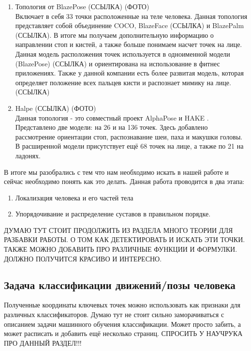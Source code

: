 \begin{enumerate} 
  \item Топология от BlazePose (ССЫЛКА) (ФОТО)\\
  \label{BlazePose's Topology}
  Включает в себя 33 точки расположенные на теле человека. Данная топология представляет собой объединение COCO, BlazeFace (ССЫЛКА) и BlazePalm (ССЫЛКА). В итоге мы получаем дополнительную информацию о направлении стоп и кистей, а также больше понимаем насчет точек на лице. Данная модель расположения точек используется в одноименной модели (BlazePose) (ССЫЛКА) и ориентирована на использование в фитнес приложениях. Также у данной компании есть более развитая модель, которая определяет положение всех пальцев кисти и распознает мимику на лице. (ССЫЛКА)
  \item Halpe (ССЫЛКА) (ФОТО)\\
  \label{Halpe}
  Данная топология - это совместный проект AlphaPose \cite{fang2017rmpe} и HAKE \cite{li2020pastanet}. Представлено две модели: на 26 и на 136 точек. Здесь добавлено рассмотрение ориентации стоп, распознавание шеи, паха и макушки головы. В расширенной модели присутствует ещё 68 точек на лице, а также по 21 на ладонях.
\end{enumerate}

В итоге мы разобрались с тем что нам необходимо искать в нашей работе и сейчас необходимо понять как это делать. Данная работа проводится в два этапа: 
\begin{enumerate}
	\item Локализация человека и его частей тела
	\item Упорядочивание и распределение суставов в правильном порядке.
\end{enumerate}

ДУМАЮ ТУТ СТОИТ ПРОДОЛЖИТЬ ИЗ РАЗДЕЛА МНОГО ТЕОРИИ ДЛЯ РАЗБАВКИ РАБОТЫ. О ТОМ КАК ДЕТЕКТИРОВАТЬ И ИСКАТЬ ЭТИ ТОЧКИ. ТАКЖЕ МОЖНО ДОБАВИТЬ ПРО РАЗЛИЧНЫЕ ФУНКЦИИ И ФОРМУЛКИ. ДОЛЖНО ПОЛУЧИТСЯ КРАСИВО И ИНТЕРЕСНО.

\subsection{Задача классификации движений/позы человека}

Полученные координаты ключевых точек можно использовать как признаки для различных классификаторов. Думаю тут не стоит сильно заморачиваться с описанием задачи машинного обучения классификации. Может просто забить, а может расписать и добавить ещё несколько страниц. СПРОСИТЬ У НАУЧРУКА ПРО ДАННЫЙ РАЗДЕЛ!!!
\newpage